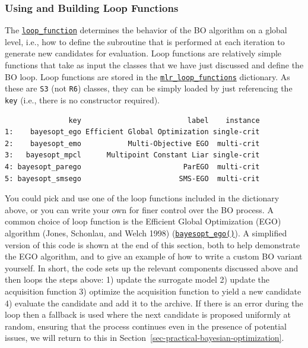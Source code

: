\hypertarget{sec-bayesian-optimization-loop}{%
\subsubsection{Using and Building Loop
Functions}\label{sec-bayesian-optimization-loop}}

The
\href{https://mlr3mbo.mlr-org.com/reference/loop_function.html}{\texttt{loop\_function}}
determines the behavior of the BO algorithm on a global level, i.e., how
to define the subroutine that is performed at each iteration to generate
new candidates for evaluation. Loop functions are
relatively simple functions that take as input the classes that we have
just discussed and define the BO loop. Loop functions are stored in the
\href{https://mlr3mbo.mlr-org.com/reference/mlr_loop_functions.html}{\texttt{mlr\_loop\_functions}}
dictionary. As these are \texttt{S3} (not \texttt{R6}) classes, they can
be simply loaded by just referencing the \texttt{key} (i.e., there is no
constructor required).

\begin{Shaded}
\begin{Highlighting}[]
\end{Highlighting}
\end{Shaded}

\begin{verbatim}
               key                         label    instance
1:    bayesopt_ego Efficient Global Optimization single-crit
2:    bayesopt_emo           Multi-Objective EGO  multi-crit
3:   bayesopt_mpcl      Multipoint Constant Liar single-crit
4: bayesopt_parego                        ParEGO  multi-crit
5: bayesopt_smsego                       SMS-EGO  multi-crit
\end{verbatim}

You could pick and use one of the loop functions included in the
dictionary above, or you can write your own for finer control over the
BO process. A common choice of loop function is the Efficient Global
Optimization (EGO) algorithm
(Jones, Schonlau, and Welch 1998)
(\href{https://mlr3mbo.mlr-org.com/reference/mlr_loop_functions_ego.html}{\texttt{bayesopt\_ego()}}).
A simplified version of this code is shown at the end of this section,
both to help demonstrate the EGO algorithm, and to give an example of
how to write a custom BO variant yourself. In short, the code sets up
the relevant components discussed above and then loops the steps above:
1) update the surrogate model 2) update the acquisition function 3)
optimize the acquisition function to yield a new candidate 4) evaluate
the candidate and add it to the archive. If there is an error during the
loop then a fallback is used where the next candidate is proposed
uniformly at random, ensuring that the process continues even in the
presence of potential issues, we will return to this in
Section~\ref{sec-practical-bayesian-optimization}.

